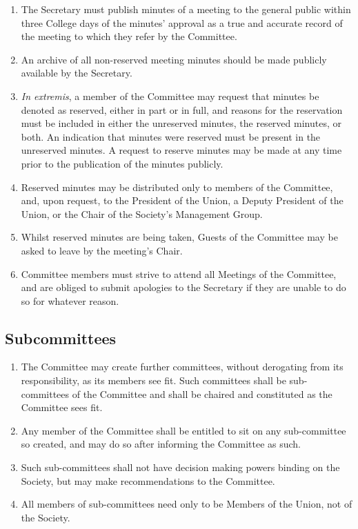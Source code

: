 \documentclass[a4paper]{tufte-handout}
\begin{document}
\begin{enumerate}[resume]
    \item The Secretary must publish minutes of a meeting to the general public within three College days of the minutes' approval as a true and accurate record of the meeting to which they refer by the Committee.
    \item An archive of all non-reserved meeting minutes should be made publicly available by the Secretary.
    \item \textit{In extremis}, a member of the Committee may request that minutes be denoted as reserved, either in part or in full, and reasons for the reservation must be included in either the unreserved minutes, the reserved minutes, or both. An indication that minutes were reserved must be present in the unreserved minutes. A request to reserve minutes may be made at any time prior to the publication of the minutes publicly.
    \item Reserved minutes may be distributed only to members of the Committee, and, upon request, to the President of the Union, a Deputy President of the Union, or the Chair of the Society's Management Group.
    \item Whilst reserved minutes are being taken, Guests of the Committee may be asked to leave by the meeting's Chair.
    \item Committee members must strive to attend all Meetings of the Committee, and are obliged to submit apologies to the Secretary if they are unable to do so for whatever reason.
\end{enumerate}

\subsection{Subcommittees}
\begin{enumerate}[resume]
    \item The Committee may create further committees, without derogating from its responsibility, as its members see fit. Such committees shall be sub-committees of the Committee and shall be chaired and constituted as the Committee sees fit.
    \item Any member of the Committee shall be entitled to sit on any sub-committee so created, and may do so after informing the Committee as such.
    \item Such sub-committees shall not have decision making powers binding on the Society, but may make recommendations to the Committee.
    \item All members of sub-committees need only to be Members of the Union, not of the Society.
\end{enumerate}
\end{document}
